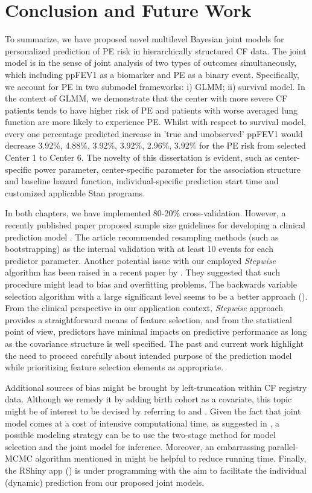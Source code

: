 \chapter{Conclusion and Future Work}\label{chp4}

To summarize, we have proposed novel multilevel Bayesian joint models for personalized prediction of PE risk in hierarchically structured CF data. The joint model is in the sense of joint analysis of two types of outcomes simultaneously, which including ppFEV1 as a biomarker and PE as a binary event. Specifically, we account for PE in two submodel frameworks: i) GLMM; ii) survival model. In the context of GLMM, we demonstrate that the center with more severe CF patients tends to have higher risk of PE and patients with worse averaged lung function are more likely to experience PE. Whilst with respect to survival model, every one percentage predicted increase in 'true and unobserved' ppFEV1 would decrease 3.92\%, 4.88\%, 3.92\%, 3.92\%, 2.96\%, 3.92\% for the PE risk from selected Center 1 to Center 6. The novelty of this dissertation is evident, such as center-specific power parameter, center-specific parameter for the association structure and baseline hazard function, individual-specific prediction start time and customized applicable Stan programs.

In both chapters, we have implemented 80-20\% cross-validation. However, a recently published paper proposed sample size guidelines for developing a clinical prediction model \cite{Riley2020}. The article recommended resampling methods (such as bootstrapping) as the internal validation with at least 10 events for each predictor parameter. Another potential issue with our employed \emph{Stepwise} algorithm has been raised in a recent paper by \cite{Harhay2020}. They suggested that such procedure might lead to bias and overfitting problems. The backwards variable selection algorithm with a large significant level seems to be a better approach (\cite{Heinze2017}). From the clinical perspective in our application context, \emph{Stepwise} approach provides a straightforward means of feature selection, and from the statistical point of view, predictors have minimal impacts on predictive performance as long as the covariance structure is well specified. The past and current work highlight the need to proceed carefully about intended purpose of the prediction model while prioritizing feature selection elements as appropriate.  

Additional sources of bias might be brought by left-truncation within CF registry data. Although we remedy it by adding birth cohort as a covariate, this topic might be of interest to be devised by referring to \cite{Krol2016} and \cite{Piccorelli2012}. Given the fact that joint model comes at a cost of intensive computational time, as suggested in \cite{Barrett2019}, a possible modeling strategy can be to use the two-stage method for model selection and the joint model for inference. Moreover, an embarrassing parallel-MCMC algorithm mentioned in \cite{Ren2021} might be helpful to reduce running time. Finally, the RShiny app (\cite{shiny2013}) is under programming with the aim to facilitate the individual (dynamic) prediction from our proposed joint models.  

